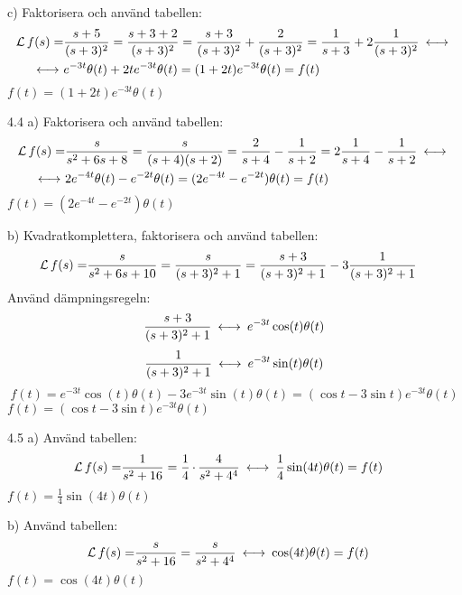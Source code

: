 \begin{task}{c)}
	Faktorisera och använd tabellen:
	\begin{align*}
	\laplace f(s)=
	&\frac{s+5}{(s+3)^2}=
	\frac{s+3+2}{(s+3)^2}=
	\frac{s+3}{(s+3)^2}+\frac{2}{(s+3)^2}=
	\frac{1}{s+3}+2\frac{1}{(s+3)^2}\llra \\ \llra
	&e^{-3t}\theta(t)+2te^{-3t}\theta(t)=
	(1+2t)e^{-3t}\theta(t)=
	f(t)
	\end{align*}
	\ans $f(t)=(1+2t)e^{-3t}\theta(t)$
\end{task}

\begin{task}{4.4 a)}
	Faktorisera och använd tabellen:
	\begin{align*}
	\laplace f(s)=
	&\frac{s}{s^2+6s+8}=
	\frac{s}{(s+4)(s+2)}=
	\frac{2}{s+4}-\frac{1}{s+2}=
	2\frac{1}{s+4}-\frac{1}{s+2}\llra  \\ \llra
	&2e^{-4t}\theta(t)-e^{-2t}\theta(t)=
	(2e^{-4t}-e^{-2t})\theta(t)=
	f(t)
	\end{align*}
	\ans $f(t)=(2e^{-4t}-e^{-2t})\theta(t)$
\end{task}

\begin{task}{b)}
	Kvadratkomplettera, faktorisera och använd tabellen:
	\begin{align*}
	\operatorname{\mathcal{L}} f(s)=
	&\frac{s}{s^2+6s+10}=
	\frac{s}{(s+3)^2+1}=
	\frac{s+3}{(s+3)^2+1}-3\frac{1}{(s+3)^2+1}
	\end{align*}
	Använd dämpningsregeln:
	\[\frac{s+3}{(s+3)^2+1}\llra e^{-3t}\cos(t)\theta(t)\]
	\[\frac{1}{(s+3)^2+1}\llra e^{-3t}\sin(t)\theta(t)\]
	\[f(t)=e^{-3t}\cos(t)\theta(t)-3e^{-3t}\sin(t)\theta(t)=(\cos t-3\sin t)e^{-3t}\theta(t)\]
	\ans $f(t)=(\cos t-3\sin t)e^{-3t}\theta(t)$
\end{task}

\begin{task}{4.5 a)}
	Använd tabellen:
	\begin{align*}
	\laplace f(s)=
	&\frac{1}{s^2+16}=
	\frac{1}{4}\*\frac{4}{s^2+4^4} \llra 
	\frac{1}{4}\sin(4t)\theta(t)=f(t)
	\end{align*}
	\ans $f(t)=\frac{1}{4}\sin(4t)\theta(t)$
\end{task}

\begin{task}{b)}
	Använd tabellen:
	\begin{align*}
	\laplace f(s)=
	&\frac{s}{s^2+16}=
	\frac{s}{s^2+4^4} \llra 
	\cos(4t)\theta(t)=f(t)
	\end{align*}
	\ans $f(t)=\cos(4t)\theta(t)$
\end{task}

